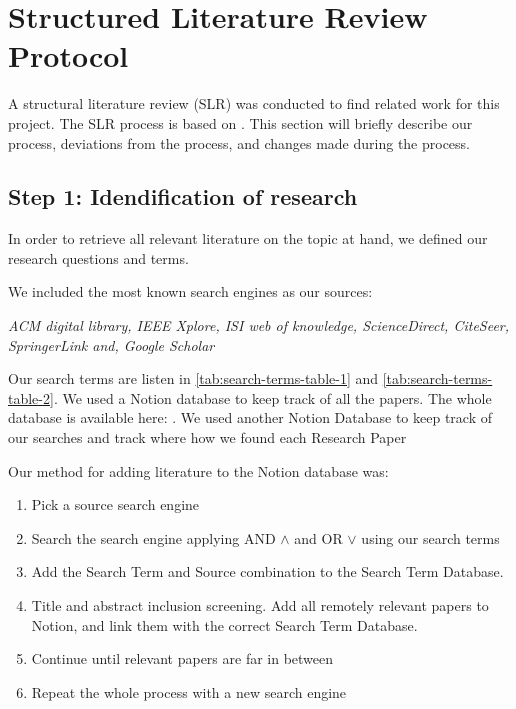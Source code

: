 
\section{Structured Literature Review Protocol}
\label{section:BT:SLR}

A structural literature review (SLR) was conducted to find related work for this project.
The SLR process is based on \cite{AndersKofod-Petersen2018}.
This section will briefly describe our process, deviations from the process,
and changes made during the process.

\subsection{Step 1: Idendification of research}
In order to retrieve all relevant literature on the topic at hand, we defined our
research questions and terms.

We included the most known search engines as our sources:

\textit{
    ACM digital library,
    IEEE Xplore,
    ISI web of knowledge,
    ScienceDirect,
    CiteSeer,
    SpringerLink and,
    Google Scholar
}

Our search terms are listen in \autoref{tab:search-terms-table-1} and \autoref{tab:search-terms-table-2}.
We used a Notion database to keep track of all the papers. The whole database is available here: \cite{slrdatabase}.
We used another Notion Database to keep track of our searches and track where how we found each Research Paper
\cite{searchtermtable}

Our method for adding literature to the Notion database was:
\begin{enumerate}
    \item Pick a source search engine
    \item Search the search engine applying AND $\wedge$ and OR $\vee$ using our search terms
    \item Add the Search Term and Source combination to the Search Term Database.
    \item Title and abstract inclusion screening. Add all remotely relevant papers to Notion, and link them with the correct Search Term Database.
    \item Continue until relevant papers are far in between
    \item Repeat the whole process with a new search engine
\end{enumerate}

